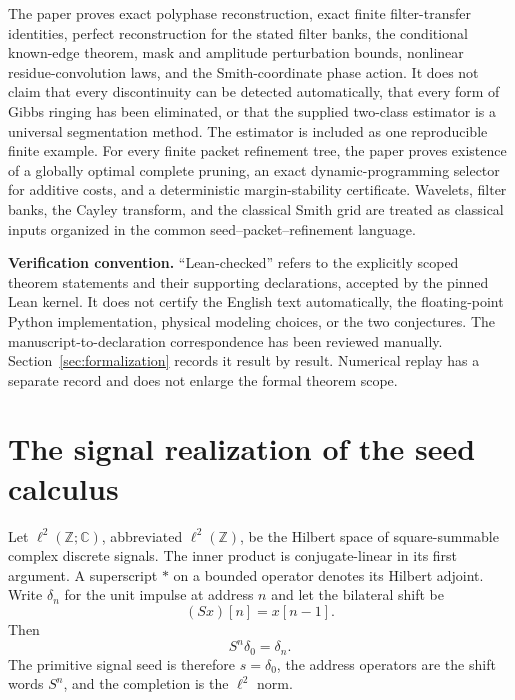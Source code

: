 \documentclass[11pt,letterpaper]{article}
\theoremstyle{plain}
\theoremstyle{plain}
\theoremstyle{plain}
\theoremstyle{definition}
\theoremstyle{definition}
\theoremstyle{definition}
\theoremstyle{definition}
\theoremstyle{remark}
\theoremstyle{remark}
\theoremstyle{remark}
\theoremstyle{remark}
\newcommand{\bbC}{\mathbb C}
\newcommand{\bbZ}{\mathbb Z}
\begin{document}
\begin{interpretation}[title={Scope and claim boundary}]
 The paper proves exact polyphase reconstruction, exact finite filter-transfer identities, perfect reconstruction for the stated filter banks, the conditional known-edge theorem, mask and amplitude perturbation bounds, nonlinear residue-convolution laws, and the Smith-coordinate phase action. It does not claim that every discontinuity can be detected automatically, that every form of Gibbs ringing has been eliminated, or that the supplied two-class estimator is a universal segmentation method. The estimator is included as one reproducible finite example.  For every finite packet refinement tree, the paper proves existence of a globally optimal complete pruning, an exact dynamic-programming selector for additive costs, and a deterministic margin-stability certificate. Wavelets, filter banks, the Cayley transform, and the classical Smith grid are treated as classical inputs organized in the common seed--packet--refinement language.
\end{interpretation}

\clearpage
\noindent\textbf{Verification convention.} ``Lean-checked'' refers to the explicitly scoped theorem statements and their supporting declarations, accepted by the pinned Lean kernel. It does not certify the English text automatically, the floating-point Python implementation, physical modeling choices, or the two conjectures. The manuscript-to-declaration correspondence has been reviewed manually. Section~\ref{sec:formalization} records it result by result. Numerical replay has a separate record and does not enlarge the formal theorem scope.



\section{The signal realization of the seed calculus}\label{core:section:01}

Let $\ell^2(\bbZ;\bbC)$, abbreviated $\ell^2(\bbZ)$, be the Hilbert space of square-summable complex discrete signals. The inner product is conjugate-linear in its first argument. A superscript $*$ on a bounded operator denotes its Hilbert adjoint. Write $\delta_n$ for the unit impulse at address $n$ and let the bilateral shift be
\[
(Sx)[n]=x[n-1].
\]
Then
\[
S^n\delta_0=\delta_n.
\]
The primitive signal seed is therefore $s=\delta_0$, the address operators are the shift words $S^n$, and the completion is the $\ell^2$ norm.
\end{document}
